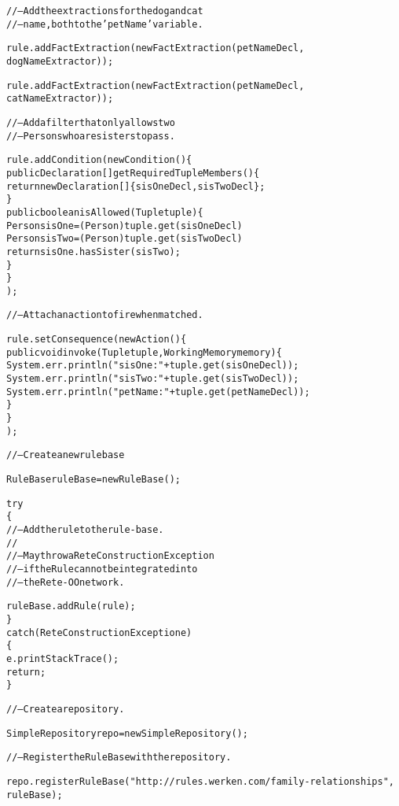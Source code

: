 \begin{alltt}
// -- Add the extractions for the dog and cat
// -- name, both to the 'petName' variable.

rule.addFactExtraction( new FactExtraction( petNameDecl,
                                            dogNameExtractor ) );

rule.addFactExtraction( new FactExtraction( petNameDecl,
                                            catNameExtractor ) );

// -- Add a filter that only allows two
// -- Persons who are sisters to pass.

rule.addCondition( new Condition() \{
        public Declaration[] getRequiredTupleMembers() \{
            return new Declaration[] \{ sisOneDecl, sisTwoDecl \};
        \}
        public boolean isAllowed(Tuple tuple) \{
            Person sisOne = (Person) tuple.get( sisOneDecl ) 
            Person sisTwo = (Person) tuple.get( sisTwoDecl ) 
            return sisOne.hasSister( sisTwo )	;
        \} 
    \}
      );

\newpage

// -- Attach an action to fire when matched.

rule.setConsequence( new Action() \{
        public void invoke(Tuple tuple, WorkingMemory memory) \{
            System.err.println( "sisOne: " + tuple.get( sisOneDecl ) );
            System.err.println( "sisTwo: " + tuple.get( sisTwoDecl ) );
            System.err.println( "petName: " + tuple.get( petNameDecl ) );
        \}
    \}
      );

// -- Create a new rule base

RuleBase ruleBase = new RuleBase();

try
\{
    // -- Add the rule to the rule-base.
    // 
    // -- May throw a ReteConstructionException 
    // -- if the Rule cannot be integrated into
    // -- the Rete-OO network.

    ruleBase.addRule( rule );
\}
catch (ReteConstructionException e)
\{
    e.printStackTrace();
    return;
\}

// -- Create a repository.

SimpleRepository repo = new SimpleRepository();

// -- Register the RuleBase with the repository.
	
repo.registerRuleBase( "http://rules.werken.com/family-relationships",
                       ruleBase );

\end{alltt}
\normalsize

\newpage

